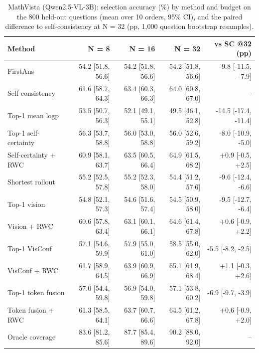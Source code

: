 \begin{table}[t]
\centering
\small
\caption{MathVista (Qwen2.5-VL-3B): selection accuracy (\%) by method and budget on the 800 held-out questions (mean over 10 orders, 95\% CI), and the paired difference to self-consistency at N = 32 (pp, 1,000 question bootstrap resamples).}
\label{tab:T3_methods_mathvista}
\begin{tabular}{lrrrr}
\toprule
Method & N = 8 & N = 16 & N = 32 & vs SC @32 (pp) \\
\midrule
FirstAns & 54.2 [51.8, 56.6] & 54.2 [51.8, 56.6] & 54.2 [51.8, 56.6] & -9.8 [-11.5, -7.9] \\
Self-consistency & 61.6 [58.7, 64.3] & 63.4 [60.3, 66.3] & 64.0 [60.8, 67.0] & -- \\
Top-1 mean logp & 53.5 [50.7, 56.3] & 52.1 [49.1, 55.1] & 49.5 [46.1, 52.8] & -14.5 [-17.4, -11.4] \\
Top-1 self-certainty & 56.3 [53.7, 58.8] & 56.0 [53.0, 58.8] & 56.0 [52.6, 59.2] & -8.0 [-10.9, -5.0] \\
Self-certainty + RWC & 60.9 [58.1, 63.7] & 63.5 [60.5, 66.4] & 64.9 [61.5, 68.2] & +0.9 [-0.5, +2.5] \\
Shortest rollout & 55.2 [52.5, 57.8] & 55.2 [52.3, 58.0] & 54.4 [51.2, 57.6] & -9.6 [-12.4, -6.6] \\
Top-1 vision & 54.8 [52.1, 57.3] & 54.6 [51.6, 57.4] & 54.5 [50.9, 58.0] & -9.5 [-12.7, -6.4] \\
Vision + RWC & 60.6 [57.8, 63.4] & 63.1 [60.1, 66.1] & 64.6 [61.4, 67.8] & +0.6 [-0.9, +2.2] \\
Top-1 VisConf & 57.1 [54.6, 59.9] & 57.9 [55.0, 61.0] & 58.5 [55.0, 62.0] & -5.5 [-8.2, -2.5] \\
VisConf + RWC & 61.7 [58.9, 64.5] & 63.9 [60.9, 66.9] & 65.1 [61.9, 68.4] & +1.1 [-0.3, +2.6] \\
Top-1 token fusion & 57.0 [54.4, 59.8] & 56.9 [54.0, 59.8] & 57.1 [53.8, 60.2] & -6.9 [-9.7, -3.9] \\
Token fusion + RWC & 61.3 [58.5, 64.1] & 63.7 [60.7, 66.6] & 64.5 [61.2, 67.8] & +0.6 [-0.9, +2.0] \\
Oracle coverage & 83.6 [81.2, 85.6] & 87.7 [85.4, 89.6] & 90.2 [88.0, 92.0] & -- \\
\bottomrule
\end{tabular}
\end{table}
